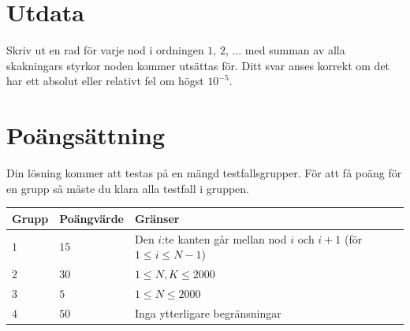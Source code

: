 \section*{Utdata}
Skriv ut en rad för varje nod i ordningen $1$, $2$, $\dots$ med summan av alla skakningars styrkor noden kommer utsättas för.
Ditt svar anses korrekt om det har ett absolut eller relativt fel om högst $10^{-5}$.

\section*{Poängsättning}
Din lösning kommer att testas på en mängd testfallsgrupper.
För att få poäng för en grupp så måste du klara alla testfall i gruppen.

\noindent
\begin{tabular}{| l | l | l |}
  \hline
  Grupp & Poängvärde & Gränser \\ \hline
  $1$    & $15$       &  Den $i$:te kanten går mellan nod $i$ och $i+1$ (för $1 \le i \le N-1$) \\ \hline 
  $2$    & $30$       &  $1 \le N,K \le 2000$ \\ \hline
  $3$    & $5$        &  $1 \le N \le 2000$ \\ \hline
  $4$    & $50$       &  Inga ytterligare begränsningar \\ \hline
\end{tabular}

